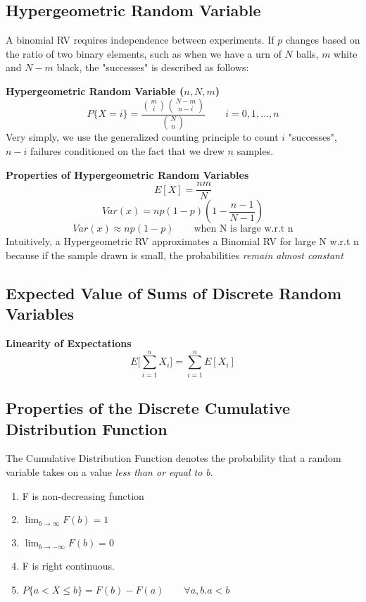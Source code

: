 \documentclass[10pt,a4paper]{article}
\begin{document}
               	\subsection{Hypergeometric Random Variable}
               	A binomial RV requires independence between experiments. If $p$ changes based on the ratio of two binary elements, such as when we have a urn of $N$ balls, $m$ white and $N-m$ black, the "successes" is described as follows:
               	\begin{framed}
               		\centering\textbf{Hypergeometric Random Variable ($n, N, m$)}
               		$$P\{X=i\} = \frac{\binom{m}{i}\binom{N-m}{n-i}}{\binom{N}{n}} \qquad i=0,1,...,n$$
               		Very simply, we use the generalized counting principle to count $i$ "successes", $n-i$ failures conditioned on the fact that we drew $n$ samples.
               	\end{framed}
               	\begin{framed}
               		\centering\textbf{Properties of Hypergeometric Random Variables}
               		$$E[X] = \frac{nm}{N}$$
               		$$Var(x) = np(1-p)(1-\frac{n-1}{N-1})$$
               		$$Var(x) \approx np(1-p) \qquad \text{when N is large w.r.t n}$$
               		Intuitively, a Hypergeometric RV approximates a Binomial RV for large N w.r.t n because if the sample drawn is small, the probabilities \emph{remain almost constant}
               	\end{framed}
               	\newpage 
               	\subsection{Expected Value of Sums of Discrete Random Variables}
               	\begin{framed}
               		\centering\textbf{Linearity of Expectations}
               		$$E\bigg[\sum^{n}_{i=1}X_{i}\bigg] = \sum^{n}_{i=1}E[X_{i}]$$
               	\end{framed}
               	\subsection{Properties of the Discrete Cumulative Distribution Function}
               	The Cumulative Distribution Function denotes the probability that a random variable takes on a value \emph{less than or equal to b}.
               	\begin{enumerate}
               	\item F is non-decreasing function
               	\item $\lim_{b \to \infty}F(b) = 1$
               	\item $\lim_{b \to -\infty}F(b) = 0$
               	\item F is right continuous. 
               	\item $P\{a < X \leq b\} = F(b) - F(a) \qquad \forall a,b.a < b$
               	\end{enumerate}
               	\newpage 
\end{document}
